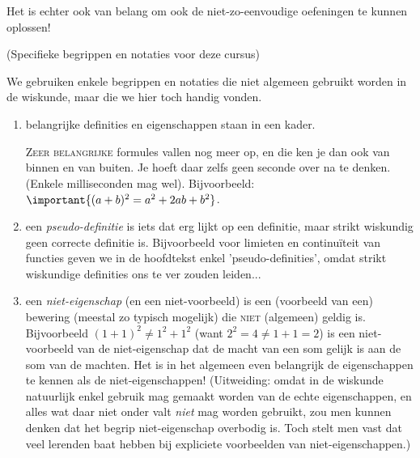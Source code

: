 \documentclass{ximera}
\begin{document}
\begin{remark}
\begin{enumerate}
		Het is echter ook van belang om ook de niet-zo-eenvoudige oefeningen te kunnen oplossen! 
		
	\end{enumerate}
\end{remark}

\begin{notation} (Specifieke begrippen en notaties voor deze cursus) 
	
	We gebruiken enkele begrippen en notaties die niet algemeen gebruikt worden in de wiskunde, maar die we hier toch handig vonden.
	\begin{enumerate}
		\item belangrijke definities en eigenschappen staan in een kader.
		
		 \textsc{Zeer belangrijke} formules vallen nog meer op, en die ken je dan ook van binnen en van buiten. Je hoeft daar zelfs geen seconde over na te denken. (Enkele milliseconden mag wel). Bijvoorbeeld: $\important{(a+b)^2 = a^2 + 2ab + b^2}$.
		\item een \textit{pseudo-definitie} is iets dat erg lijkt op een definitie, maar strikt wiskundig geen correcte definitie is. Bijvoorbeeld voor limieten en continuïteit van functies geven we in de hoofdtekst enkel 'pseudo-definities', omdat strikt wiskundige definities ons te ver zouden leiden...
		\item een \textit{niet-eigenschap} (en een niet-voorbeeld) is een (voorbeeld van een) bewering (meestal zo typisch mogelijk) die \textsc{niet} (algemeen) geldig is. Bijvoorbeeld $(1+1)^2 \neq 1^2+1^2$ (want $2^2 = 4 \neq 1 + 1 = 2$) is een niet-voorbeeld van de niet-eigenschap dat de macht van een som gelijk is aan de som van de machten. Het is in het algemeen even belangrijk de eigenschappen te kennen als de niet-eigenschappen! (Uitweiding: omdat in de wiskunde natuurlijk enkel gebruik mag gemaakt worden van de echte eigenschappen, en alles wat daar niet onder valt \textit{niet} mag worden gebruikt, zou men kunnen denken dat het begrip niet-eigenschap overbodig is. Toch stelt men vast dat veel lerenden baat hebben bij expliciete voorbeelden van niet-eigenschappen.)
	\end{enumerate}
\end{notation}
\end{document}
